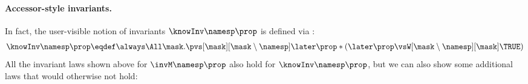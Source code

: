 \paragraph{Accessor-style invariants.}
In fact, the user-visible notion of invariants $\knowInv\namesp\prop$ is defined via :
\begin{align*}
  \knowInv\namesp\prop \eqdef \always\All\mask. \pvs[\mask][\mask\setminus\namesp] \later\prop * (\later\prop \vsW[\mask\setminus\namesp][\mask] \TRUE)
\end{align*}
All the invariant laws shown above for $\invM\namesp\prop$ also hold for $\knowInv\namesp\prop$, but we can also show some additional laws that would otherwise not hold:

